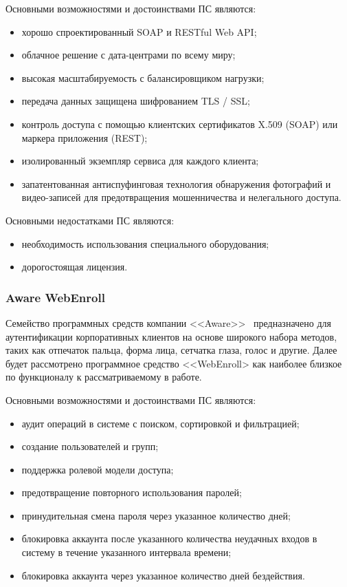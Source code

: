 Основными возможностями и достоинствами ПС являются:
\begin{itemize}
  \item хорошо спроектированный SOAP и RESTful Web API;
  \item облачное решение с дата-центрами по всему миру;
  \item высокая масштабируемость с балансировщиком нагрузки;
  \item передача данных защищена шифрованием TLS / SSL;
  \item контроль доступа с помощью клиентских сертификатов X.509 (SOAP) или маркера приложения (REST);
  \item изолированный экземпляр сервиса для каждого клиента;
  \item запатентованная антиспуфинговая технология обнаружения фотографий и видео-записей для предотвращения мошенничества и нелегального доступа.
\end{itemize}

Основными недостатками ПС являются:
\begin{itemize}
  \item необходимость использования специального оборудования;
  \item дорогостоящая лицензия.
\end{itemize}

\subsubsection{Aware WebEnroll}
\label{sub:domain:analogs:aware}
Семейство программных средств компании <<Aware>>~\cite{analogs_aware} предназначено для аутентификации корпоративных клиентов на основе широкого набора методов, таких как отпечаток пальца, форма лица, сетчатка глаза, голос и другие. Далее будет рассмотрено программное средство <<WebEnroll> как наиболее близкое по функционалу к рассматриваемому в работе.

Основными возможностями и достоинствами ПС являются:
\begin{itemize}
    \item аудит операций в системе с поиском, сортировкой и фильтрацией;
    \item создание пользователей и групп;
    \item поддержка ролевой модели доступа;
    \item предотвращение повторного использования паролей;
    \item принудительная смена пароля через указанное количество дней;
    \item блокировка аккаунта после указанного количества неудачных входов в систему в течение указанного интервала времени;
    \item блокировка аккаунта через указанное количество дней бездействия.
\end{itemize}

